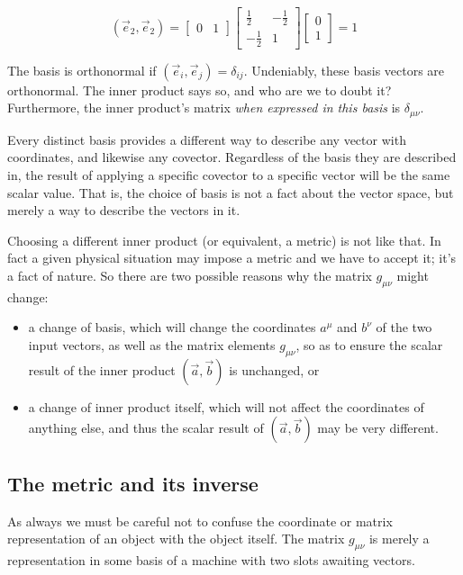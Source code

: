 $$
(\vec{e}_2, \vec{e}_2) =
\begin{bmatrix}
0 & 1
\end{bmatrix}
\begin{bmatrix}
\frac{1}{2} & -\frac{1}{2} \\
-\frac{1}{2} & 1
\end{bmatrix}
\begin{bmatrix}
0 \\ 1
\end{bmatrix}
= 1
$$    

The basis is orthonormal if $(\vec{e}_i, \vec{e}_j) = \delta_{ij}$. Undeniably, these basis vectors are orthonormal. The inner product says so, and who are we to doubt it? Furthermore, the inner product's matrix \textit{when expressed in this basis} is $\delta_{\mu\nu}$.

Every distinct basis provides a different way to describe any vector with coordinates, and likewise any covector. Regardless of the basis they are described in, the result of applying a specific covector to a specific vector will be the same scalar value. That is, the choice of basis is not a fact about the vector space, but merely a way to describe the vectors in it.

Choosing a different inner product (or equivalent, a metric) is not like that. In fact a given physical situation may impose a metric and we have to accept it; it's a fact of nature. So there are two possible reasons why the matrix $g_{\mu\nu}$ might change:

\begin{itemize}
    \item a change of basis, which will change the coordinates $a^{\mu}$ and $b^{\nu}$ of the two input vectors, as well as the matrix elements $g_{\mu\nu}$, so as to ensure the scalar result of the inner product $(\vec{a}, \vec{b})$ is unchanged, or
    \item a change of inner product itself, which will not affect the coordinates of anything else, and thus the scalar result of $(\vec{a}, \vec{b})$ may be very different.
\end{itemize}

\subsection{The metric and its inverse}

As always we must be careful not to confuse the coordinate or matrix representation of an object with the object itself. The matrix $g_{\mu\nu}$ is merely a representation in some basis of a machine with two slots awaiting vectors. 

